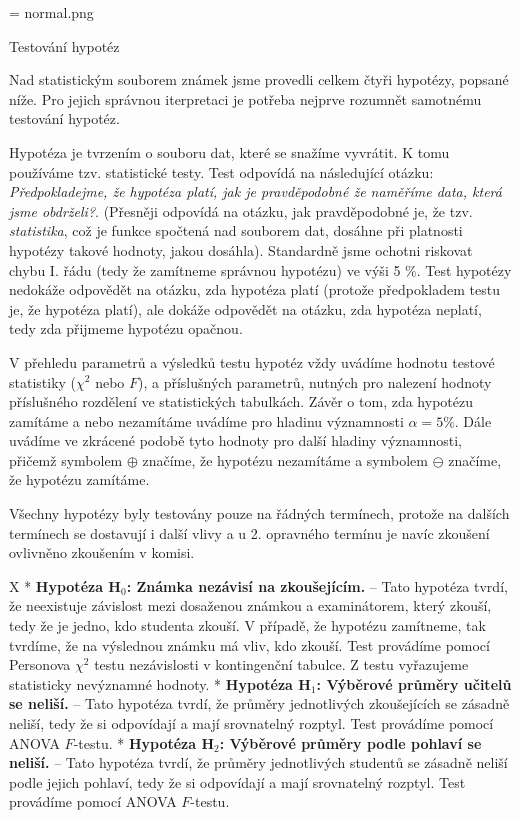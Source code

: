\picw=\hsize \picheight=0pt {\inspic normal.png }

\notoc\sec Testování hypotéz

Nad statistickým souborem známek jsme provedli celkem čtyři hypotézy, popsané níže. Pro jejich správnou iterpretaci je potřeba nejprve rozumnět samotnému testování hypotéz.

Hypotéza je tvrzením o souboru dat, které se snažíme vyvrátit. K tomu používáme tzv. statistické testy. Test odpovídá na následující otázku: {\em Předpokladejme, že hypotéza platí, jak je pravděpodobné
že naměříme data, která jsme obdrželi?}. (Přesněji odpovídá na otázku, jak pravděpodobné je, že tzv. {\em statistika}, což je funkce spočtená nad souborem dat, dosáhne při platnosti
hypotézy takové hodnoty, jakou dosáhla). Standardně jsme ochotni riskovat chybu I. řádu (tedy že zamítneme správnou hypotézu) ve výši 5 \%. Test hypotézy nedokáže odpovědět na otázku, 
zda hypotéza platí (protože předpokladem testu je, že hypotéza platí), ale dokáže odpovědět na otázku, zda hypotéza neplatí, tedy zda přijmeme hypotézu opačnou.

V přehledu parametrů a výsledků testu hypotéz vždy uvádíme hodnotu testové statistiky ($\chi^2$ nebo $F$), a příslušných parametrů, nutných pro nalezení hodnoty příslušného rozdělení
ve statistických tabulkách. Závěr o tom, zda hypotézu zamítáme a nebo nezamítáme uvádíme pro hladinu významnosti $\alpha = 5 \%$. Dále uvádíme ve zkrácené podobě tyto hodnoty pro další 
hladiny významnosti, přičemž symbolem $\oplus$ značíme, že hypotézu nezamítáme a symbolem $\ominus$ značíme, že hypotézu zamítáme.

Všechny hypotézy byly testovány pouze na řádných termínech, protože na dalších termínech se dostavují i další vlivy a u 2. opravného termínu je navíc zkoušení ovlivněno zkoušením v komisi.

\begitems \style X
* {\bf Hypotéza H${}_0$: Známka nezávisí na zkoušejícím.} -- Tato hypotéza tvrdí, že neexistuje závislost mezi dosaženou známkou a examinátorem, který zkouší, tedy že je jedno, kdo studenta zkouší. V případě, že hypotézu zamítneme, 
tak tvrdíme, že na výslednou známku má vliv, kdo zkouší. Test provádíme pomocí Personova $\chi^2$ testu nezávislosti v kontingenční tabulce. Z testu vyřazujeme statisticky nevýznamné hodnoty.
* {\bf Hypotéza H${}_1$: Výběrové průměry učitelů se neliší.} -- Tato hypotéza tvrdí, že průměry jednotlivých zkoušejících se zásadně neliší, tedy že si odpovídají a mají srovnatelný rozptyl. Test provádíme pomocí ANOVA $F$\/-testu.
* {\bf Hypotéza H${}_2$: Výběrové průměry podle pohlaví se neliší.} -- Tato hypotéza tvrdí, že průměry jednotlivých studentů se zásadně neliší podle jejich pohlaví, tedy že si odpovídají a mají srovnatelný rozptyl. Test provádíme pomocí ANOVA $F$\/-testu.
\enditems

\endmulti
